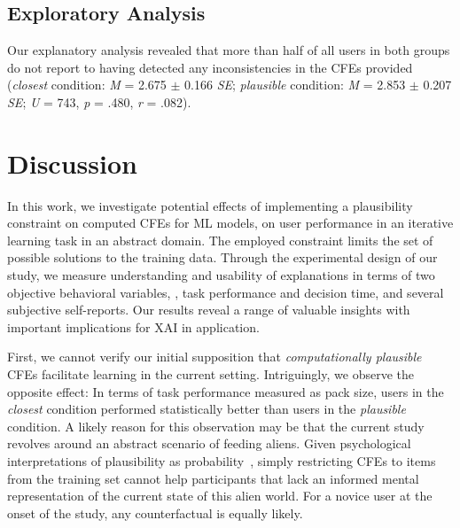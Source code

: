 \subsection{Exploratory Analysis}
Our explanatory analysis revealed that more than half of all users in both groups do not report to having detected any inconsistencies in the \glspl{CFE} provided (\textit{closest} condition: \textit{M} = 2.675 $\pm$ 0.166 \textit{SE}; \textit{plausible} condition: \textit{M} = 2.853 $\pm$ 0.207 \textit{SE}; \textit{U} = 743, \textit{p} = .480, \textit{r} = .082).

\section{Discussion}\label{sec:discussion}

In this work, we investigate potential effects of implementing a plausibility constraint on computed \glspl{CFE} for \gls{ML} models, on user performance in an iterative learning task in an abstract domain. 
The employed constraint limits the set of possible solutions to the training data.
Through the experimental design of our study, we measure understanding and usability of explanations in terms of two objective behavioral variables, \ie, task performance and decision time, and several subjective self-reports. 
Our results reveal a range of valuable insights with important implications for \gls{XAI} in application.

First, we cannot verify our initial supposition that \textit{computationally plausible} \glspl{CFE} facilitate learning in the current setting. 
Intriguingly, we observe the opposite effect: In terms of task performance measured as pack size, users in the \textit{closest} condition performed statistically better than users in the \textit{plausible} condition.
A likely reason for this observation may be that the current study revolves around an abstract scenario of feeding aliens. 
Given psychological interpretations of plausibility as probability~\citep{pezdek_is_2006, de_brigard_remembering_2013}, simply restricting \glspl{CFE} to items from the training set cannot help participants that lack an informed mental representation of the current state of this alien world. 
For a novice user at the onset of the study, any counterfactual is equally likely.

